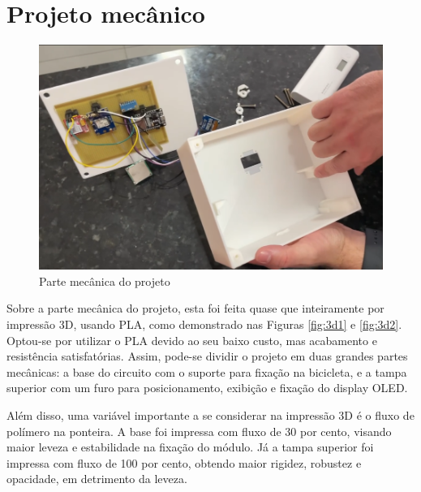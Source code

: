 \section{Projeto mecânico}
\begin{figure}[!h]
\centering
\includegraphics[width=15cm]{capitulos/Figuras/Mecanica.png}
\caption{Parte mecânica do projeto}
\label{fig:diagrama_hardware}
\end{figure}

Sobre a parte mecânica do projeto, esta foi feita quase que inteiramente por impressão 3D, usando PLA, como demonstrado nas Figuras \ref{fig:3d1} e \ref{fig:3d2}. Optou-se por utilizar o PLA devido ao seu baixo custo, mas acabamento e resistência satisfatórias. Assim, pode-se dividir o projeto em duas grandes partes mecânicas: a base do circuito com o suporte para fixação na bicicleta, e a tampa superior com um furo para posicionamento, exibição e fixação do display OLED.

Além disso, uma variável importante a se considerar na impressão 3D é o fluxo de polímero na ponteira. A base foi impressa com fluxo de 30 por cento, visando maior leveza e estabilidade na fixação do módulo. Já a tampa superior foi impressa com fluxo de 100 por cento, obtendo maior rigidez, robustez e opacidade, em detrimento da leveza.

\newpage

